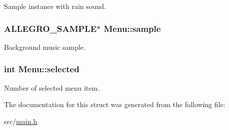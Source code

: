 Sample instance with rain sound. \hypertarget{structMenu_a19a25811d2d08b8fa1d1819088168b72}{
\subsubsection[{sample}]{\setlength{\rightskip}{0pt plus 5cm}A\-L\-L\-E\-G\-R\-O\-\_\-\-S\-A\-M\-P\-L\-E$\ast$ Menu\-::sample}}\label{structMenu_a19a25811d2d08b8fa1d1819088168b72}
Background music sample. \hypertarget{structMenu_a608e2768a5458057048bf1c7ab9a81aa}{
\subsubsection[{selected}]{\setlength{\rightskip}{0pt plus 5cm}int Menu\-::selected}}\label{structMenu_a608e2768a5458057048bf1c7ab9a81aa}
Number of selected menu item. 

The documentation for this struct was generated from the following file\-:\begin{DoxyCompactItemize}
\item 
src/\hyperlink{main_8h}{main.\-h}\end{DoxyCompactItemize}
